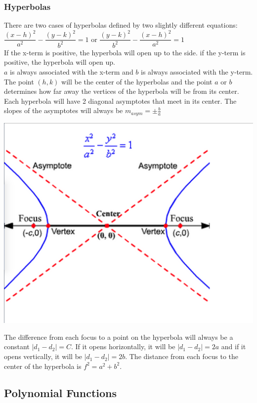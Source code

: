 \documentclass[11pt, fleqn]{article}
\begin{document}
\subsubsection{Hyperbolas}
There are two cases of hyperbolas defined by two slightly different equations: $\dfrac{(x-h)^2}{a^2}-\dfrac{(y-k)^2}{b^2}=1$ or $\dfrac{(y-k)^2}{b^2}-\dfrac{(x-h)^2}{a^2}=1$\\
If the x-term is positive, the hyperbola will open up to the side. if the y-term is positive, the hyperbola will open up.\\
$a$ is always associated with the x-term and $b$ is always associated with the y-term.\\
The point $(h,k)$ will be the center of the hyperbolas and the point $a$ or $b$ determines how far away the vertices of the hyperbola will be from its center. Each hyperbola will have 2 diagonal asymptotes that meet in its center. The slopes of the asymptotes will always be $m_{asym}=\pm\frac{b}{a}$\\
\centerline{\includegraphics[scale=0.3]{PreCalcPictures/HyperbolaGraph.png}}
The difference from each focus to a point on the hyperbola will always be a constant $|d_1-d_2|=C$. If it opens horizontally, it will be $|d_1-d_2|=2a$ and if it opens vertically, it will be $|d_1-d_2|=2b$. The distance from each focus to the center of the hyperbola is $f^2=a^2+b^2$.








\subsection{Polynomial Functions}
\end{document}
